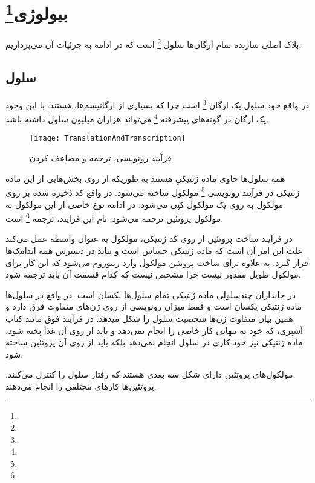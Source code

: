\pagebreak
\section{بیولوژی\protect\footnote{}}

بلاک اصلی سازنده تمام ارگان‌ها سلول
\footnote{}
است که در ادامه به جزئیات آن می‌پردازیم.

\subsection{سلول}

در واقع خود سلول یک ارگان
\footnote{}
است چرا که بسیاری از ارگانیسم‌ها،
هستند.
با این وجود یک ارگان در گونه‌های پیشرفته
\footnote{}
می‌تواند هزاران میلیون سلول داشته باشد.

\begin{wrapfigure}{l}{0.5\textwidth} 
    \begin{center}
    \texttt{[image: TranslationAndTranscription]} 
    \end{center}
    \caption{ فرآیند رونویسی، ترجمه و مضاعف کردن}
    \label{figure:translationAndTranscription}
\end{wrapfigure}

همه سلول‌ها حاوی ماده‌ ژنتیکیِ
هستند به طوریکه از روی بخش‌هایی از این ماده ژنتیکی در فرآیند رونویسی
\footnote{}
مولکول
ساخته می‌شود. در واقع کد ذخیره شده بر روی مولکول
به روی یک مولکول
کپی می‌شود. در ادامه نوع خاصی از این مولکول
به مولکول پروتئین ترجمه می‌شود. نام این فرایند، ترجمه
\footnote{}
است.

 در فرآیند ساخت پروتئین از روی کد ژنتیکی، مولکول
به عنوان واسطه عمل می‌کند علت این امر آن است که ماده ژنتیکی حساس است و نباید در دسترس همه اندامک‌ها قرار گیرد. به علاوه برای ساخت پروتئین مولکول
وارد ریبوزوم می‌شود که این کار برای مولکول طویل
مقدور نیست چرا مشخص نیست که کدام قسمت آن باید ترجمه شود.

در جانداران چندسلولی ماده‌ ژنتیکی تمام سلول‌ها یکسان است. در واقع در سلول‌ها ماده‌ ژنتیکی یکسان است و فقط میزان رونویسی از روی ژن‌های متفاوت فرق دارد و همین بیان متفاوت ژن‌ها شخصیت سلول را شکل میدهد. در فرآیند فوق مانند کتاب آشپزی، که خود به تنهایی کار خاصی را انجام نمی‌دهد و باید از روی آن غذا پخته شود، ماده‌ ژنتیکی نیز خود کاری در سلول انجام نمی‌دهد  بلکه باید از روی آن پرو‌تئین ساخته شود. 

\noindent
مولکول‌های پرو‌تئین دارای شکل سه بعدی هستند که رفتار سلول را کنترل می‌کنند. پروتئین‌ها کارهای مختلفی را انجام می‌دهند.

